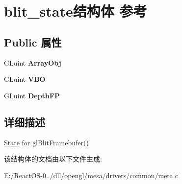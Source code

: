 \hypertarget{structblit__state}{}\section{blit\+\_\+state结构体 参考}
\label{structblit__state}
\subsection*{Public 属性}
\begin{DoxyCompactItemize}
\item 
\mbox{\label{structblit__state_a44fa4a893a909e8250b7455ad38a4d76}} 
G\+Luint {\bfseries Array\+Obj}
\item 
\mbox{\label{structblit__state_ac2732412c6054afc05ebeaf08be58318}} 
G\+Luint {\bfseries V\+BO}
\item 
\mbox{\label{structblit__state_a34b395cbe875ddc7e1e79b682e56b96a}} 
G\+Luint {\bfseries Depth\+FP}
\end{DoxyCompactItemize}


\subsection{详细描述}
\hyperlink{struct_state}{State} for gl\+Blit\+Framebufer() 

该结构体的文档由以下文件生成\+:\begin{DoxyCompactItemize}
\item 
E\+:/\+React\+O\+S-\/0../dll/opengl/mesa/drivers/common/meta.\+c\end{DoxyCompactItemize}
